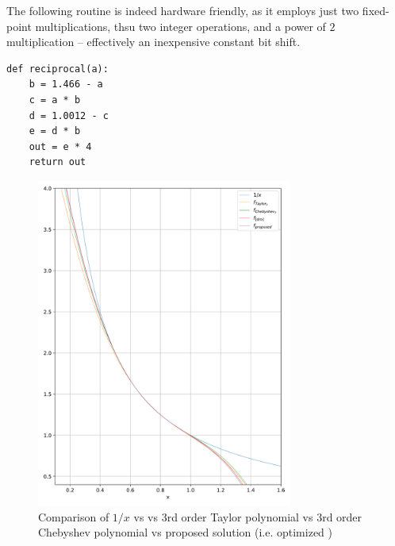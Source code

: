 The following routine is indeed hardware friendly, as it employs just two fixed-point multiplications, thsu two integer operations, and a power of $2$ multiplication -- effectively an inexpensive constant bit shift. 

\begin{verbatim}
def reciprocal(a):
    b = 1.466 - a
    c = a * b
    d = 1.0012 - c
    e = d * b
    out = e * 4
    return out
\end{verbatim}


\begin{figure}
    \centering
    \includegraphics[width=0.75\textwidth]{figures/reciprocate_real_vs_taylor_vs_drom.pdf}
    \caption{Comparison of $1/x$ vs \cite{drom} vs 3rd order Taylor polynomial vs 3rd order Chebyshev polynomial vs proposed solution (i.e. optimized \cite{drom})}
    \label{fig:0203012875432985734}
\end{figure}

